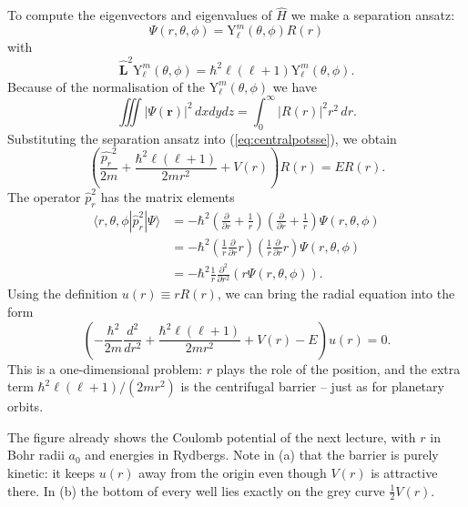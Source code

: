 To compute the eigenvectors and eigenvalues of $\widehat{H}$ we make a separation ansatz:
\begin{equation}
	\Psi(r,\theta,\phi) = \text{Y}_{\ell}^m(\theta,\phi) R(r) 
\end{equation}
with
\begin{equation}
	\widehat{\mathbf{L}}^2\text{Y}_{\ell}^m(\theta,\phi) = \hbar^2 \ell(\ell+1)\text{Y}_{\ell}^m(\theta,\phi).
\end{equation}
Because of the normalisation of the $\text{Y}_{\ell}^m(\theta,\phi)$ we have
\begin{equation}
	\iiint |\Psi(\mathbf{r})|^2\,dxdydz = \int_0^{\infty} |R(r)|^2 r^2\, dr.
\end{equation}
Substituting the separation ansatz into (\ref{eq:centralpotsse}), we obtain
\begin{equation}
	\left(\frac{\widehat{p_r}^2}{2m} + \frac{\hbar^2\ell(\ell+1)}{2mr^2} + V(r)\right)R(r) = E R(r).
\end{equation}
The operator $\widehat{p}_r^2$ has the matrix elements 
\begin{equation}
	\begin{split}
		\langle r,\theta,\phi|\widehat{p}_r^2|\Psi\rangle &= -\hbar^2\left(\frac{\partial}{\partial r} + \frac{1}{r}\right)\left(\frac{\partial}{\partial r} + \frac{1}{r}\right)\Psi(r,\theta,\phi) \\
		&= -\hbar^2\left(\frac{1}{r}\frac{\partial}{\partial r} r\right)\left(\frac{1}{r}\frac{\partial}{\partial r} r\right)\Psi(r,\theta,\phi) \\ 
		&= -\hbar^2 \frac{1}{r}\frac{\partial^2}{\partial r^2}\left(r \Psi(r,\theta,\phi)\right).
	\end{split}
\end{equation}
Using the definition $u(r)\equiv rR(r)$, we can bring the radial equation into the form
\begin{equation}
	\left(-\frac{\hbar^2}{2m}\frac{d^2}{dr^2} + \frac{\hbar^2\ell(\ell+1)}{2mr^2} + V(r) - E\right)u(r) = 0.
\end{equation}
This is a one-dimensional problem: $r$ plays the role of the position, and the extra term $\hbar^2\ell(\ell+1)/(2mr^2)$ is the centrifugal barrier -- just as for planetary orbits.



The figure already shows the Coulomb potential of the next lecture, with $r$
in Bohr radii $a_0$ and energies in Rydbergs. Note in (a) that the
barrier is purely kinetic: it keeps $u(r)$ away from the origin even though $V(r)$
is attractive there. In (b) the bottom of every well lies exactly
on the grey curve $\tfrac12 V(r)$.

